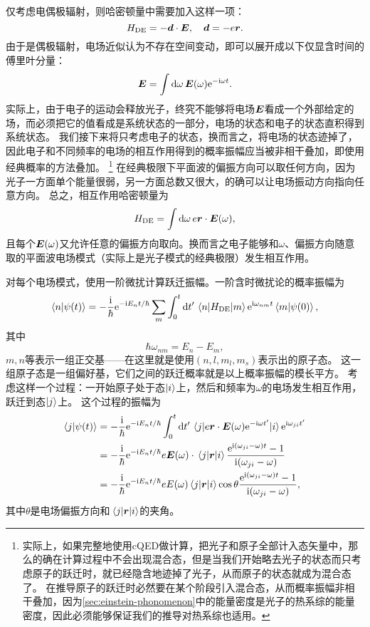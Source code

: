 仅考虑电偶极辐射，则哈密顿量中需要加入这样一项：
\begin{equation}
    {H}_\text{DE} = - {\vb*{d}} \cdot \vb*{E}, \quad {\vb*{d}} = -e {\vb*{r}}.
\end{equation}
由于是偶极辐射，电场近似认为不存在空间变动，即可以展开成以下仅显含时间的傅里叶分量：
\[
    \vb*{E} = \int \dd{\omega} \vb*{E}(\omega) \mathrm{e}^{- \mathrm{i} \omega t}.
\]
实际上，由于电子的运动会释放光子，终究不能够将电场$\vb*{E}$看成一个外部给定的场，而必须把它的值看成是系统状态的一部分，电场的状态和电子的状态直积得到系统状态。
我们接下来将只考虑电子的状态，换而言之，将电场的状态迹掉了，因此电子和不同频率的电场的相互作用得到的概率振幅应当被非相干叠加，即使用经典概率的方法叠加。%
\footnote{实际上，如果完整地使用cQED做计算，把光子和原子全部计入态矢量中，那么的确在计算过程中不会出现混合态，但是当我们开始略去光子的状态而只考虑原子的跃迁时，就已经隐含地迹掉了光子，从而原子的状态就成为混合态了。
在推导原子的跃迁时必然要在某个阶段引入混合态，从而概率振幅非相干叠加，因为\autoref{sec:einstein-phonomenon}中的能量密度是光子的热系综的能量密度，因此必须能够保证我们的推导对热系综也适用。}%
在经典极限下平面波的偏振方向可以取任何方向，因为光子一方面单个能量很弱，另一方面总数又很大，的确可以让电场振动方向指向任意方向。
总之，相互作用哈密顿量为
\[
    {H}_\text{DE} = \int \dd{\omega} e {\vb*{r}} \cdot \vb*{E}(\omega),
\]
且每个$\vb*{E}(\omega)$又允许任意的偏振方向取向。换而言之电子能够和$\omega$、偏振方向随意取的平面波电场模式（实际上是光子模式的经典极限）发生相互作用。

对每个电场模式，使用一阶微扰计算跃迁振幅。一阶含时微扰论的概率振幅为
\[
    \braket{n}{\psi(t)} = - \frac{\mathrm{i}}{\hbar} \mathrm{e}^{- \mathrm{i} E_n t / \hbar} \sum_m \int_0^t \dd{t'} \mel{n}{{H}_\text{DE}}{m} \mathrm{e}^{\mathrm{i} \omega_{nm} t} \braket{m}{\psi(0)},
\]
其中
\[
    \hbar \omega_{nm} = E_n - E_m,
\]
$m, n$等表示一组正交基——在这里就是使用$(n, l, m_l, m_s)$表示出的原子态。
这一组原子态是一组偏好基，它们之间的跃迁概率就是以上概率振幅的模长平方。
考虑这样一个过程：一开始原子处于态$\ket{i}$上，然后和频率为$\omega$的电场发生相互作用，跃迁到态$\ket{j}$上。
这个过程的振幅为
\[
    \begin{aligned}
        \braket{j}{\psi(t)} &= - \frac{\mathrm{i}}{\hbar} \mathrm{e}^{- \mathrm{i} E_n t / \hbar} \int_0^t \dd{t'} \mel{j}{e {\vb*{r}} \cdot \vb*{E}(\omega) \mathrm{e}^{- \mathrm{i}\omega t'}}{i} \mathrm{e}^{\mathrm{i} \omega_{ji} t'} \\
        &= - \frac{\mathrm{i}}{\hbar} \mathrm{e}^{- \mathrm{i} E_n t / \hbar} e \vb*{E}(\omega) \cdot \mel{j}{{\vb*{r}}}{i} \frac{\mathrm{e}^{\mathrm{i} (\omega_{ji} - \omega) t} - 1}{\mathrm{i} (\omega_{ji} - \omega)} \\
        &= - \frac{\mathrm{i}}{\hbar} \mathrm{e}^{- \mathrm{i} E_n t / \hbar} e E(\omega) \mel{j}{{\vb*{r}}}{i} \cos \theta \frac{\mathrm{e}^{\mathrm{i} (\omega_{ji} - \omega) t} - 1}{\mathrm{i} (\omega_{ji} - \omega)},
    \end{aligned}
\]
其中$\theta$是电场偏振方向和$\mel{j}{{\vb*{r}}}{i}$的夹角。

